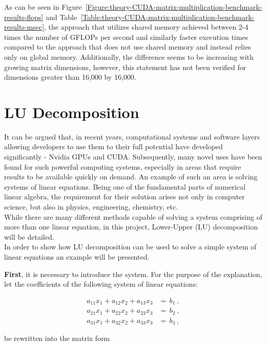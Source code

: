 As can be seen in Figure~\ref{Figure:theory-CUDA-matrix-multiplication-benchmark-results-flops} and Table~\ref{Table:theory-CUDA-matrix-multiplication-benchmark-results-msec}, the approach that utilizes shared memory achieved between 2-4 times the number of GFLOPs per second and similarly faster execution times compared to the approach that does not use shared memory and instead relies only on global memory. Additionally, the difference seems to be increasing with growing matrix dimensions, however, this statement has not been verified for dimensions greater than 16,000 by 16,000.



\section{LU Decomposition}\label{Section:theory-LU-decomposition}
It can be argued that, in recent years, computational systems and software layers allowing developers to use them to their full potential have developed significantly - Nvidia GPUs and CUDA. Subsequently, many novel uses have been found for such powerful computing systems, especially in areas that require results to be available quickly on demand. An example of such an area is solving systems of linear equations. Being one of the fundamental parts of numerical linear algebra, the requirement for their solution arises not only in computer science, but also in physics, engineering, chemistry, etc. \\
While there are many different methods capable of solving a system comprising of more than one linear equation, in this project, Lower-Upper (LU) decomposition will be detailed. \\
In order to show how LU decomposition can be used to solve a simple system of linear equations an example will be presented. 
\par \textbf{First}, it is necessary to introduce the system. For the purpose of the explanation, let the coefficients of the following system of linear equations:

\begin{align}
	a_{11}x_1 + a_{12}x_2 + a_{13}x_{3}&= \,b_1 \nonumber\,, \\ 
	a_{21}x_1 + a_{22}x_2 + a_{23}x_{3}&= \,b_2 \label{Equation:theory-LU-decomposition-system-linear-equations}\,, \\
	a_{31}x_1 + a_{32}x_2 + a_{33}x_{3}&= \,b_3 \nonumber\,,
\end{align}

be rewritten into the matrix form

